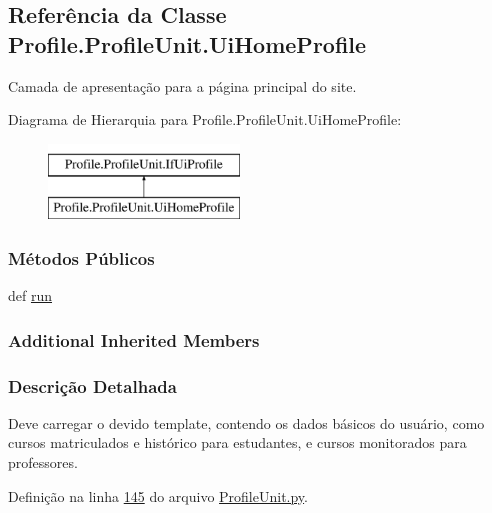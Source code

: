 \hypertarget{classProfile_1_1ProfileUnit_1_1UiHomeProfile}{\subsection{Referência da Classe Profile.\-Profile\-Unit.\-Ui\-Home\-Profile}
\label{classProfile_1_1ProfileUnit_1_1UiHomeProfile}
}


Camada de apresentação para a página principal do site.  


Diagrama de Hierarquia para Profile.\-Profile\-Unit.\-Ui\-Home\-Profile\-:\begin{figure}[H]
\begin{center}
\leavevmode
\includegraphics[height=2.000000cm]{db/dcf/classProfile_1_1ProfileUnit_1_1UiHomeProfile}
\end{center}
\end{figure}
\subsubsection*{Métodos Públicos}
\begin{DoxyCompactItemize}
\item 
def \hyperlink{classProfile_1_1ProfileUnit_1_1UiHomeProfile_a5abc7f7c1ca1cb3e070c36a869263e6d}{run}
\end{DoxyCompactItemize}
\subsubsection*{Additional Inherited Members}


\subsubsection{Descrição Detalhada}
Deve carregar o devido template, contendo os dados básicos do usuário, como cursos matriculados e histórico para estudantes, e cursos monitorados para professores. 

Definição na linha \hyperlink{ProfileUnit_8py_source_l00145}{145} do arquivo \hyperlink{ProfileUnit_8py_source}{Profile\-Unit.\-py}.



